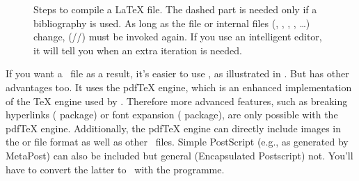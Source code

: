 \begin{figure}
  \newcommand*\pnode[2][]{\path (#2) node[rectangle, draw, thick,
    minimum width=20\unitlength, minimum height=10\unitlength,#1]}
  \newcommand*\fnode[2][]{%
    \draw[thick,#1] (#2) +(-5,5) -- +(5,5) --
      +(5,-5) .. controls +(-2,2)  and +(2,1)  ..
      +(0,-5) .. controls +(-2,-1) and +(2,-2) ..
      +(-5,-5) -- cycle;
    \path (#2) node[rectangle, minimum width=10\unitlength,
                    minimum height=10\unitlength, align=center]}
  \setlength\unitlength{1mm}
  \centering
  \medskip
  \caption[Steps to compile a LaTeX file]{Steps to compile a LaTeX file. The
    dashed part is needed only if a bibliography is used. As long as the
     file or internal files (, , ,
    , \ldots) change, (//)
    must be invoked again. If you use an intelligent editor, it will tell you
    when an extra iteration is needed.}%
  \label{fig:compile}
\end{figure}
If you want a \PDF~file as a result, it's easier to use , as
illustrated in . But  has other advantages
too. It uses the pdfTeX engine, which is an enhanced implementation of the TeX
engine used by . Therefore more advanced features, such as breaking
hyperlinks ( package) or font expansion (
package), are only possible with the pdfTeX engine. Additionally, the pdfTeX
engine can directly include images in the  or  file format
as well as other \PDF\ files. Simple PostScript (e.g., as generated by
MetaPost) can also be included but general  (Encapsulated Postscript)
not. You'll have to convert the latter to \PDF\ with the 
programme.

